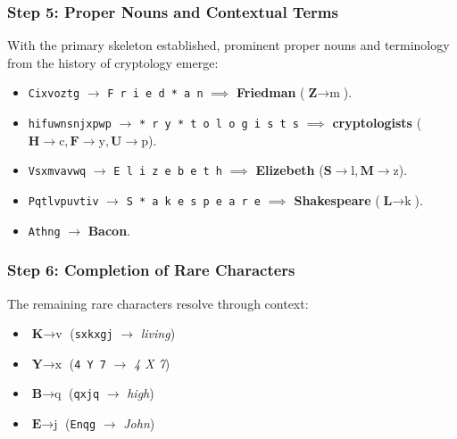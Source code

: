\documentclass[12pt,a4paper]{article}
\begin{document}
\subsubsection{Step 5: Proper Nouns and Contextual Terms}
With the primary skeleton established, prominent proper nouns and terminology from the history of cryptology emerge:
\begin{itemize}
    \item \texttt{Cixvoztg} $\to$ \texttt{F r i e d * a n} $\implies$ \textbf{Friedman} ($\textbf{Z} \to \text{m}$).
    \item \texttt{hifuwnsnjxpwp} $\to$ \texttt{* r y * t o l o g i s t s} $\implies$ \textbf{cryptologists} ($\textbf{H} \to \text{c}, \textbf{F} \to \text{y}, \textbf{U} \to \text{p}$).
    \item \texttt{Vsxmvavwq} $\to$ \texttt{E l i z e b e t h} $\implies$ \textbf{Elizebeth} ($\textbf{S} \to \text{l}, \textbf{M} \to \text{z}$).
    \item \texttt{Pqtlvpuvtiv} $\to$ \texttt{S * a k e s p e a r e} $\implies$ \textbf{Shakespeare} ($\textbf{L} \to \text{k}$).
    \item \texttt{Athng} $\to$ \textbf{Bacon}.
\end{itemize}

\subsubsection{Step 6: Completion of Rare Characters}
The remaining rare characters resolve through context:
\begin{itemize}
    \item $\textbf{K} \to \text{v}$ (\texttt{sxkxgj} $\to$ \textit{living})
    \item $\textbf{Y} \to \text{x}$ (\texttt{4 Y 7} $\to$ \textit{4 X 7})
    \item $\textbf{B} \to \text{q}$ (\texttt{qxjq} $\to$ \textit{high})
    \item $\textbf{E} \to \text{j}$ (\texttt{Enqg} $\to$ \textit{John})
\end{itemize}
\end{document}
